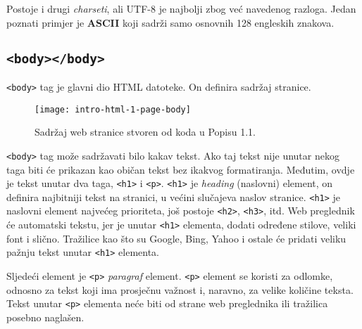 Postoje i drugi \textit{charseti}, ali UTF-8 je najbolji zbog već navedenog razloga.
Jedan poznati primjer je \textbf{ASCII} koji sadrži samo osnovnih 128 engleskih znakova.

\subsection{\texttt{<body></body>}}\label{subsec:body}

\lstinline!<body>! tag je glavni dio HTML datoteke.
On definira sadržaj stranice.

\begin{figure}[h]
    \texttt{[image: intro-html-1-page-body]}
    \caption{Sadržaj web stranice stvoren od koda u Popisu 1.1.}
\end{figure}

\lstinline!<body>! tag može sadržavati bilo kakav tekst.
Ako taj tekst nije unutar nekog taga biti će prikazan kao običan tekst bez ikakvog formatiranja.
Međutim, ovdje je tekst unutar dva taga, \lstinline!<h1>! i \lstinline!<p>!.
\lstinline!<h1>! je \textit{heading} (naslovni) element, on definira najbitniji tekst na stranici, u većini slučajeva naslov stranice.
\lstinline!<h1>! je naslovni element najvećeg prioriteta, još postoje \lstinline!<h2>!, \lstinline!<h3>!, itd.
Web preglednik će automatski tekstu, jer je unutar \lstinline!<h1>! elementa, dodati određene stilove, veliki font i slično.
Tražilice kao što su Google, Bing, Yahoo i ostale će pridati veliku pažnju tekst unutar \lstinline!<h1>! elementa.

Sljedeći element je \lstinline!<p>! \textit{paragraf} element.
\lstinline!<p>! element se koristi za odlomke, odnosno za tekst koji ima prosječnu važnost i, naravno, za velike količine teksta.
Tekst unutar \lstinline!<p>! elementa neće biti od strane web preglednika ili tražilica posebno naglašen.
